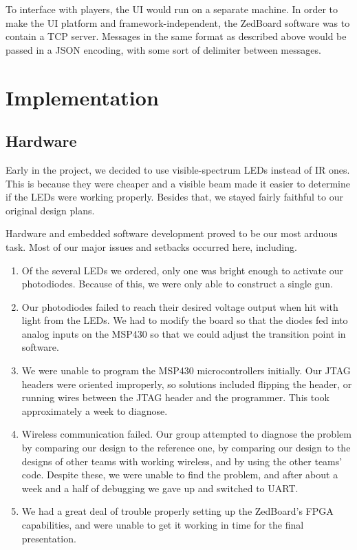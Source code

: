 \documentclass[oneside]{book}
\begin{document}
To interface with players, the UI would run on a separate machine.
In order to make the UI platform and framework-independent,
the ZedBoard software was to contain a TCP server.
Messages in the same format as described above would be passed in a JSON encoding,
with some sort of delimiter between messages.

\section{Implementation}

\subsection{Hardware}

Early in the project, we decided to use visible-spectrum LEDs instead of IR ones.
This is because they were cheaper and a visible beam made it easier to determine
if the LEDs were working properly.
Besides that, we stayed fairly faithful to our original design plans.

Hardware and embedded software development proved to be our most arduous task.
Most of our major issues and setbacks occurred here, including.
\begin{enumerate}
\item Of the several LEDs we ordered, only one was bright enough to activate
	our photodiodes.
	Because of this, we were only able to construct a single gun.
\item Our photodiodes failed to reach their desired voltage output
	when hit with light from the LEDs.
	We had to modify the board so that the diodes fed into analog inputs
	on the MSP430 so that we could adjust the transition point in software.
\item We were unable to program the MSP430 microcontrollers initially.
	Our JTAG headers were oriented improperly, so solutions included flipping the header,
	or running wires between the JTAG header and the programmer.
	This took approximately a week to diagnose.
\item Wireless communication failed.
	Our group attempted to diagnose the problem by comparing our design to the reference one,
	by comparing our design to the designs of other teams with working wireless,
	and by using the other teams' code.
	Despite these, we were unable to find the problem,
	and after about a week and a half of debugging we gave up and switched to UART.
\item We had a great deal of trouble properly setting up the ZedBoard's FPGA
	capabilities, and were unable to get it working in time for the final presentation.
\end{enumerate}
\end{document}
